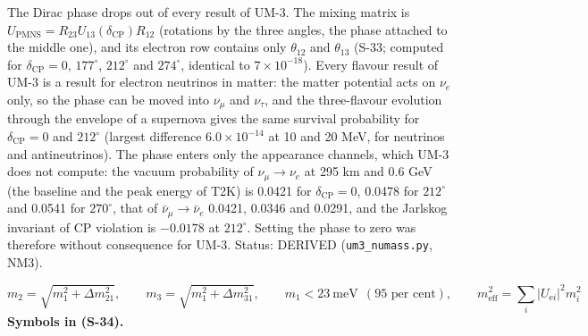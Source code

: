 \documentclass[
  10pt,
]{article}
\begin{document}
The Dirac phase drops out of every result of UM-3. The mixing matrix is
\(U_{\mathrm{PMNS}} = R_{23}U_{13}(\delta_{\mathrm{CP}})R_{12}\)
(rotations by the three angles, the phase attached to the middle one),
and its electron row contains only \(\theta_{12}\) and \(\theta_{13}\)
(S-33; computed for \(\delta_{\mathrm{CP}} = 0\), \(177^\circ\),
\(212^\circ\) and \(274^\circ\), identical to \(7\times10^{-18}\)).
Every flavour result of UM-3 is a result for electron neutrinos in
matter: the matter potential acts on \(\nu_e\) only, so the phase can be
moved into \(\nu_\mu\) and \(\nu_\tau\), and the three-flavour evolution
through the envelope of a supernova gives the same survival probability
for \(\delta_{\mathrm{CP}} = 0\) and \(212^\circ\) (largest difference
\(6.0\times10^{-14}\) at 10 and 20 MeV, for neutrinos and
antineutrinos). The phase enters only the appearance channels, which
UM-3 does not compute: the vacuum probability of \(\nu_\mu \to \nu_e\)
at 295 km and 0.6 GeV (the baseline and the peak energy of T2K) is
0.0421 for \(\delta_{\mathrm{CP}} = 0\), 0.0478 for \(212^\circ\) and
0.0541 for \(270^\circ\), that of \(\bar\nu_\mu \to \bar\nu_e\) 0.0421,
0.0346 and 0.0291, and the Jarlskog invariant of CP violation is
\(-0.0178\) at \(212^\circ\). Setting the phase to zero was therefore
without consequence for UM-3. Status: DERIVED (\texttt{um3\_numass.py},
NM3).

\[
m_2 = \sqrt{m_1^2 + \Delta m^2_{21}},\qquad m_3 = \sqrt{m_1^2 + \Delta m^2_{31}},\qquad
m_1 < 23\ \text{meV}\ \ (\text{95 per cent}),\qquad
m_{\mathrm{eff}}^2 = \sum_i\lvert U_{\mathrm{e}i}\rvert^2m_i^2 \tag{S-34}
\] \textbf{Symbols in (S-34).}
\end{document}
